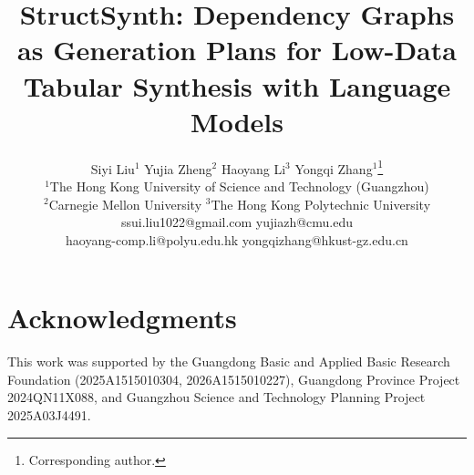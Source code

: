 \documentclass[11pt]{article}
\title{StructSynth: Dependency Graphs as Generation Plans for Low-Data Tabular Synthesis with Language Models}
\author{
  Siyi Liu$^{1}$ \quad
  Yujia Zheng$^{2}$ \quad
  Haoyang Li$^{3}$ \quad
  Yongqi Zhang$^{1}$\thanks{Corresponding author.} \\
  {\normalfont\normalsize $^{1}$The Hong Kong University of Science and Technology (Guangzhou)} \\
  {\normalfont\normalsize $^{2}$Carnegie Mellon University \quad
  $^{3}$The Hong Kong Polytechnic University} \\[-1pt]
  {\normalfont\normalsize\ttfamily ssui.liu1022@gmail.com \quad
  yujiazh@cmu.edu} \\
  {\normalfont\normalsize\ttfamily haoyang-comp.li@polyu.edu.hk \quad
  yongqizhang@hkust-gz.edu.cn}
}
\begin{document}
\maketitle











\section*{Acknowledgments}
This work was supported by the Guangdong Basic and Applied Basic Research Foundation (2025A1515010304, 2026A1515010227), Guangdong Province Project 2024QN11X088, and Guangzhou Science and Technology Planning Project 2025A03J4491.



\newpage
\appendix

\end{document}
